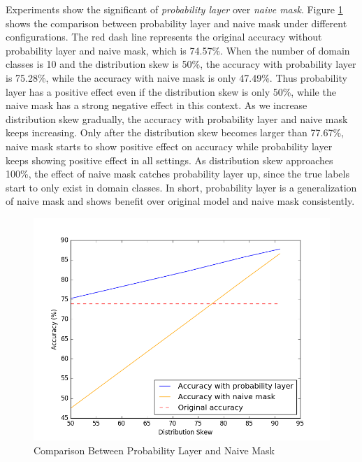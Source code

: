 \documentclass[conference]{IEEEtran}
\begin{document}
\begin{spacing}{0.9}
Experiments show the significant of \textit{probability layer} over \textit{naive mask}. Figure \ref{fig:NaiveMask} shows the comparison between probability layer and naive mask under different configurations. The red dash line represents the original accuracy without probability layer and naive mask, which is 74.57\%. When the number of domain classes is 10 and the distribution skew is 50\%, the accuracy with probability layer is 75.28\%, while the accuracy with naive mask is only 47.49\%. Thus probability layer has a positive effect even if the distribution skew is only 50\%, while the naive mask has a strong negative effect in this context. As we increase distribution skew gradually, the accuracy with probability layer and naive mask keeps increasing. Only after the distribution skew becomes larger than 77.67\%, naive mask starts to show positive effect on accuracy while probability layer keeps showing positive effect in all settings. As distribution skew approaches 100\%, the effect of naive mask catches probability layer up, since the true labels start to only exist in domain classes. In short, probability layer is a generalization of naive mask and shows benefit over original model and naive mask consistently.

\begin{figure}
\includegraphics[scale=0.43]{figure_1-1.png}
\caption{Comparison Between Probability Layer and Naive Mask}
\label{fig:NaiveMask}
\end{figure}



\end{spacing}
\end{document}
